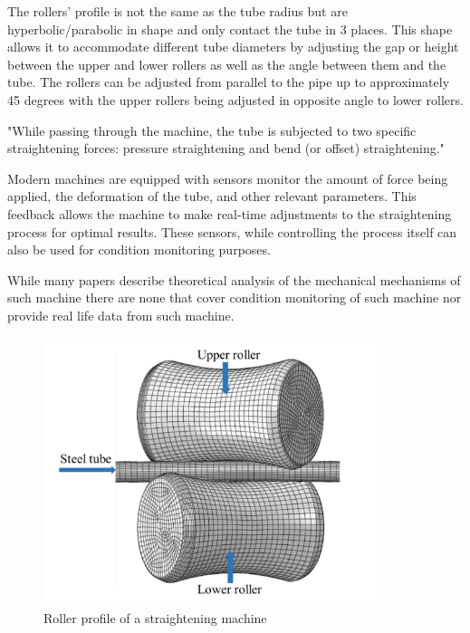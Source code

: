 \documentclass[]{article}
\begin{document}
The rollers' profile is not the same as the tube radius but are hyperbolic/parabolic in shape and only contact the tube in 3 places. This shape allows it to accommodate different tube diameters by adjusting the gap or height between the upper and lower rollers as well as the angle between them and the tube. The rollers can be adjusted from parallel to the pipe up to approximately 45 degrees with the upper rollers being adjusted in opposite angle to lower rollers.

"While passing through the machine, the tube is subjected to two specific straightening forces: pressure straightening and bend (or offset) straightening."

Modern machines are equipped with sensors monitor the amount of force being applied, the deformation of the tube, and other relevant parameters. This feedback allows the machine to make real-time adjustments to the straightening process for optimal results. These sensors, while controlling the process itself can also be used for condition monitoring purposes.

While many papers describe theoretical analysis of the mechanical mechanisms of such machine there are none that cover condition monitoring of such machine nor provide real life data from such machine.

\begin{figure}[H]
	\centering
	\includegraphics[width=\textwidth]{straightening2.png}
	\caption{Roller profile of a straightening machine~\cite{ma2020effect}}
	\label{straighteningImage2}
\end{figure}
\end{document}
